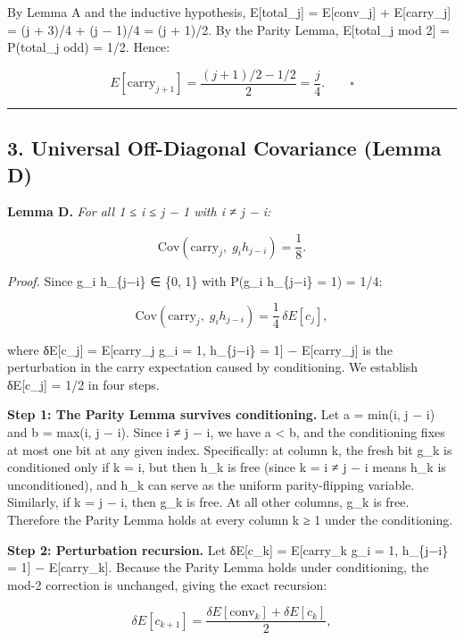 \documentclass[
  11pt,
]{article}
\begin{document}
By Lemma A and the inductive hypothesis, E{[}total\_j{]} = E{[}conv\_j{]} +
E{[}carry\_j{]} = (j + 3)/4 + (j − 1)/4 = (j + 1)/2. By the Parity Lemma,
E{[}total\_j mod 2{]} = P(total\_j odd) = 1/2. Hence:

\[E[\text{carry}_{j+1}] = \frac{(j+1)/2 - 1/2}{2} = \frac{j}{4}. \qquad \square\]

\begin{center}\rule{0.5\linewidth}{0.5pt}\end{center}

\newpage

\subsection{3. Universal Off-Diagonal Covariance (Lemma
D)}\label{universal-off-diagonal-covariance-lemma-d}

\textbf{Lemma D.} \emph{For all 1 ≤ i ≤ j − 1 with i ≠ j − i:}

\[\text{Cov}(\text{carry}_j,\; g_i h_{j-i}) = \frac{1}{8}.\]

\emph{Proof.} Since g\_i h\_\{j−i\} ∈ \{0, 1\} with P(g\_i h\_\{j−i\} = 1) =
1/4:

\[\text{Cov}(\text{carry}_j,\; g_i h_{j-i}) = \frac{1}{4}\,\delta E[c_j],\]

where δE{[}c\_j{]} = E{[}carry\_j \textbar{} g\_i = 1, h\_\{j−i\} = 1{]} −
E{[}carry\_j{]} is the perturbation in the carry expectation caused by
conditioning. We establish δE{[}c\_j{]} = 1/2 in four steps.

\textbf{Step 1: The Parity Lemma survives conditioning.} Let a = min(i, j − i)
and b = max(i, j − i). Since i ≠ j − i, we have a \textless{} b, and the
conditioning fixes at most one bit at any given index. Specifically: at column
k, the fresh bit g\_k is conditioned only if k = i, but then h\_k is free (since
k = i ≠ j − i means h\_k is unconditioned), and h\_k can serve as the uniform
parity-flipping variable. Similarly, if k = j − i, then g\_k is free. At all
other columns, g\_k is free. Therefore the Parity Lemma holds at every column k
≥ 1 under the conditioning.

\textbf{Step 2: Perturbation recursion.} Let δE{[}c\_k{]} = E{[}carry\_k
\textbar{} g\_i = 1, h\_\{j−i\} = 1{]} − E{[}carry\_k{]}. Because the Parity
Lemma holds under conditioning, the mod-2 correction is unchanged, giving the
exact recursion:

\[\delta E[c_{k+1}] = \frac{\delta E[\text{conv}_k] + \delta E[c_k]}{2},\]
\end{document}
